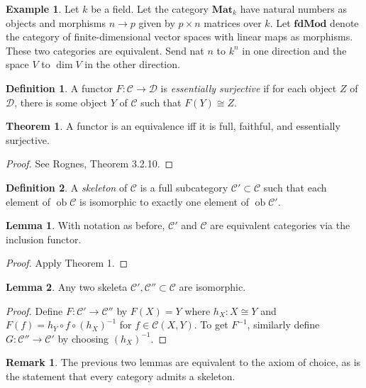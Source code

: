 \documentclass[10pt,letterpaper,cm]{nupset}
\theoremstyle{definition}
\newtheorem*{definition}{Definition}
\newtheorem{exmp}{Example}
\newtheorem{remark}{Remark}
\newtheorem{theorem}{Theorem}
\newtheorem{lemma}{Lemma}
\newcommand{\1}{\mathbf{1}}
\renewcommand{\c}{\mathscr{C}}
\renewcommand{\d}{\mathscr{D}}
\newcommand{\0}{\vec 0}
\DeclareMathOperator{\ob}{ob}
\begin{document}
\begin{exmp}
Let $k$ be a field. Let the category $\mathbf{Mat}_k$  have natural numbers as objects and morphisms $n \to p$ given by $p \times n$ matrices over $k$. Let $\mathbf{fdMod}$ denote the category of finite-dimensional vector spaces with linear maps as morphisms. These two categories are equivalent. Send nat $n$ to $k^n$ in one direction and the space $V$ to $\dim V$ in the other direction.    
\end{exmp}

\begin{definition}
A functor $F : \c \to \d$ is \textit{essentially surjective} if for each object $Z$ of  $\d$, there is some object $Y$ of $\c$ such that $F(Y) \cong Z$.
\end{definition}

\begin{theorem}
A functor is an equivalence iff it is full, faithful, and essentially surjective. 
\end{theorem}
\begin{proof}
See Rognes, Theorem 3.2.10.
\end{proof}

\begin{definition}
A \textit{skeleton} of $\c$ is a full subcategory $\c' \subset \c$ such that each element of $\ob \c$ is isomorphic to exactly one element of $\ob \c'$.
\end{definition}

\begin{lemma}
With notation as before, $\c'$ and $\c$ are equivalent categories via the inclusion functor.
\end{lemma}
\begin{proof}
Apply Theorem 1.
\end{proof}

\begin{lemma}
Any two skeleta $\c', \c'' \subset \c$ are isomorphic.
\end{lemma}
\begin{proof}
Define $F: \c' \to \c''$ by $F(X) =Y$ where $h_X: X \cong Y$ and $F(f) = h_Y \circ f \circ (h_X)^{-1}$ for $f\in \c(X, Y)$. 
To get $F^{-1}$, similarly define $G: \c'' \to \c'$ by choosing $(h_X)^{-1}$.
\end{proof}

\begin{remark}
The previous two lemmas are equivalent to the axiom of choice, as is the statement that every category admits a skeleton.
\end{remark}
\end{document}
